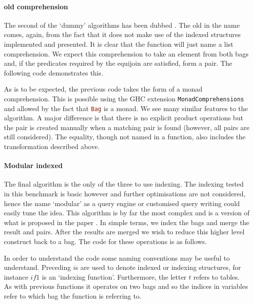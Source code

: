 \paragraph{old comprehension} The second of the `dummy' algorithms has been
dubbed \oldcomprehension{}. The old in the name comes, again, from the fact that
it does not make use of the indexed structures implemented and presented. It is
clear that the function will just name a list comprehension. We expect this
comprehension to take an element from both bags and, if the predicates required
by the equijoin are satisfied, form a pair. The following code demonstrates
this.



\noindent
As is to be expected, the previous code takes the form of a monad comprehension.
This is possible using the GHC extension \verb|MonadComprehensions| and allowed by
the fact that \lstinline[language=Haskell]{Bag} is a monad. We see many similar
features to the \modularproduct{} algorithm. A major difference is that there is
no explicit product operations but the pair is created manually when a matching
pair is found (however, all pairs are still considered). The equality, though
not named in a function, also includes the transformation described above.

\paragraph{Modular indexed} The final algorithm is the only of the three to use
indexing. The indexing tested in this benchmark is basic however and further
optimisations are not considered, hence the name `modular' as a query engine or
customised query writing could easily tune the idea. This algorithm is by far
the most complex and is a version of what is proposed in the paper \relalg{}. In
simple terms, we index the bags and merge the result and pairs. After the results are
merged we wish to reduce this higher level construct back to a bag. The code for
these operations is as follows.



\noindent
In order to understand the code some naming conventions may be useful to
understand. Preceding $i$s are used to denote indexed or indexing structures,
for instance $if1$ is an `indexing function'. Furthermore, the letter $t$
refers to tables. As with previous functions it operates on two bags and
so the indices in variables refer to which bag the function is referring to.

